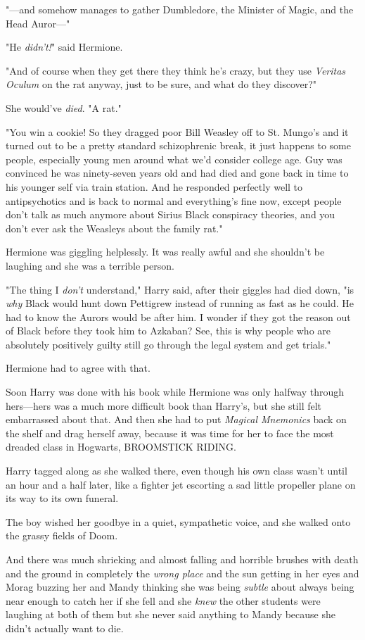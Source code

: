 "---and somehow manages to gather Dumbledore, the Minister of Magic, and the
Head Auror\mbox{---}"

"He \emph{didn't!}" said Hermione.

"And of course when they get there they think he's crazy, but they use
\emph{Veritas Oculum} on the rat anyway, just to be sure, and what do they
discover?"

She would've \emph{died}. "A rat."

"You win a cookie! So they dragged poor Bill Weasley off to St. Mungo's and it
turned out to be a pretty standard schizophrenic break, it just happens to some
people, especially young men around what we'd consider college age. Guy was
convinced he was ninety-seven years old and had died and gone back in time to
his younger self via train station. And he responded perfectly well to
antipsychotics and is back to normal and everything's fine now, except people
don't talk as much anymore about Sirius Black conspiracy theories, and you
don't ever ask the Weasleys about the family rat."

Hermione was giggling helplessly. It was really awful and she shouldn't be
laughing and she was a terrible person.

"The thing I \emph{don't} understand," Harry said, after their giggles had died
down, "is \emph{why} Black would hunt down Pettigrew instead of running as fast
as he could. He had to know the Aurors would be after him. I wonder if they got
the reason out of Black before they took him to Azkaban? See, this is why
people who are absolutely positively guilty still go through the legal system
and get trials."

Hermione had to agree with that.

Soon Harry was done with his book while Hermione was only halfway through
hers---hers was a much more difficult book than Harry's, but she still felt
embarrassed about that. And then she had to put \emph{Magical Mnemonics} back
on the shelf and drag herself away, because it was time for her to face the
most dreaded class in Hogwarts, BROOMSTICK RIDING.

Harry tagged along as she walked there, even though his own class wasn't until
an hour and a half later, like a fighter jet escorting a sad little propeller
plane on its way to its own funeral.

The boy wished her goodbye in a quiet, sympathetic voice, and she walked onto
the grassy fields of Doom.

And there was much shrieking and almost falling and horrible brushes with death
and the ground in completely the \emph{wrong place} and the sun getting in her
eyes and Morag buzzing her and Mandy thinking she was being \emph{subtle} about
always being near enough to catch her if she fell and she \emph{knew} the other
students were laughing at both of them but she never said anything to Mandy
because she didn't actually want to die.

